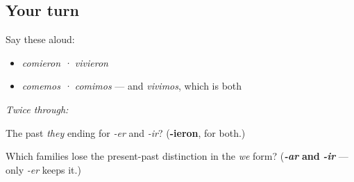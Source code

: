 \subsection*{Your turn}
Say these aloud:

\begin{itemize}
\raggedright
  \item \emph{comieron · vivieron}
  \item \emph{comemos · comimos} — and \emph{vivimos}, which is both
\end{itemize}

\emph{Twice through:}

\begin{tcolorbox}[breakable,colback=teal!4,colframe=teal!35!black,title={Before you move on}]
The past \emph{they} ending for \emph{-er} and \emph{-ir}? (\textbf{-ieron}, for both.)

Which families lose the present-past distinction in the \emph{we} form? (\emph{\textbf{-ar}} \textbf{and} \emph{\textbf{-ir}} — only \emph{-er} keeps it.)
\end{tcolorbox}
